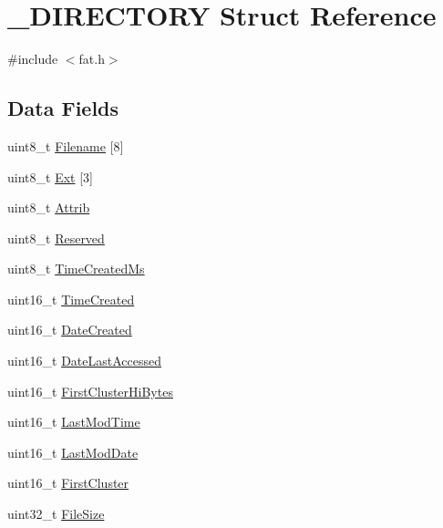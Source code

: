 \hypertarget{struct__DIRECTORY}{}\section{\+\_\+\+D\+I\+R\+E\+C\+T\+O\+RY Struct Reference}
\label{struct__DIRECTORY}


{\ttfamily \#include $<$fat.\+h$>$}

\subsection*{Data Fields}
\begin{DoxyCompactItemize}
\item 
uint8\+\_\+t \hyperlink{struct__DIRECTORY_ab9950ebc3a840e0ad44f1aa3e2a05be6}{Filename} \mbox{[}8\mbox{]}
\item 
uint8\+\_\+t \hyperlink{struct__DIRECTORY_ac29a0cf993ecea88a7b7a4050be9b025}{Ext} \mbox{[}3\mbox{]}
\item 
uint8\+\_\+t \hyperlink{struct__DIRECTORY_a01c9dc5d98375e3205b87b3188165413}{Attrib}
\item 
uint8\+\_\+t \hyperlink{struct__DIRECTORY_a0c6a3f809355165500632158bb89273c}{Reserved}
\item 
uint8\+\_\+t \hyperlink{struct__DIRECTORY_a5fea072b6e2e5b9c1921d6d04f9ab5e9}{Time\+Created\+Ms}
\item 
uint16\+\_\+t \hyperlink{struct__DIRECTORY_a6eda82476c383777293ee3ec945537d7}{Time\+Created}
\item 
uint16\+\_\+t \hyperlink{struct__DIRECTORY_a7a4fe27d7f0751594dd0d7f458c5dff0}{Date\+Created}
\item 
uint16\+\_\+t \hyperlink{struct__DIRECTORY_a779c681de0304d76409a3783cafda05c}{Date\+Last\+Accessed}
\item 
uint16\+\_\+t \hyperlink{struct__DIRECTORY_ae62a72d82aa0203065f37196210a0de5}{First\+Cluster\+Hi\+Bytes}
\item 
uint16\+\_\+t \hyperlink{struct__DIRECTORY_ac628fc1cc05972577424858d0046345d}{Last\+Mod\+Time}
\item 
uint16\+\_\+t \hyperlink{struct__DIRECTORY_a84aa4428dc379a985fba877a88f41d89}{Last\+Mod\+Date}
\item 
uint16\+\_\+t \hyperlink{struct__DIRECTORY_a587e8955f97e6b4bac5f0f0778e08a4f}{First\+Cluster}
\item 
uint32\+\_\+t \hyperlink{struct__DIRECTORY_a7e15691413cbea31518a0d989de5ff0e}{File\+Size}
\end{DoxyCompactItemize}



